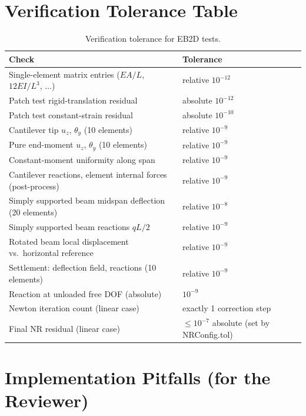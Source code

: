 \documentclass[11pt,a4paper]{article}
\begin{document}
\section{Verification Tolerance Table}

\begin{table}[h!]
\centering
\begin{tabular}{l l}
\toprule
Check & Tolerance \\
\midrule
Single-element matrix entries ($EA/L$, $12EI/L^3$, $\dots$) & relative $10^{-12}$ \\
Patch test rigid-translation residual & absolute $10^{-12}$ \\
Patch test constant-strain residual & absolute $10^{-10}$ \\
Cantilever tip $u_z$, $\theta_y$ (10 elements) & relative $10^{-9}$ \\
Pure end-moment $u_z$, $\theta_y$ (10 elements) & relative $10^{-9}$ \\
Constant-moment uniformity along span & relative $10^{-9}$ \\
Cantilever reactions, element internal forces (post-process) & relative $10^{-9}$ \\
Simply supported beam midspan deflection (20 elements) & relative $10^{-8}$ \\
Simply supported beam reactions $qL/2$ & relative $10^{-9}$ \\
Rotated beam local displacement vs.\ horizontal reference & relative $10^{-9}$ \\
Settlement: deflection field, reactions (10 elements) & relative $10^{-9}$ \\
Reaction at unloaded free DOF (absolute) & $10^{-9}$ \\
Newton iteration count (linear case) & exactly 1 correction step \\
Final NR residual (linear case) & $\leq 10^{-7}$ absolute (set by NRConfig.tol) \\
\bottomrule
\end{tabular}
\caption{Verification tolerance for EB2D tests.}
\end{table}

\section{Implementation Pitfalls (for the Reviewer)}
\end{document}
